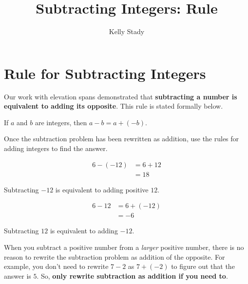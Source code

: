 \documentclass{ximera}[font=12pt]
\title{Subtracting Integers: Rule}   %
\author{Kelly Stady}
\begin{document}
\begin{abstract}

\end{abstract}

\maketitle
\label{xim:SubtractIntIntro}

\section*{Rule for Subtracting Integers}

Our work with elevation spans demonstrated that \textbf{subtracting a number is equivalent to adding its opposite}. This rule is stated formally below.

\begin{procedure}

If $a$ and $b$ are integers, then $a-b = a + (-b).$  \\

\end{procedure}

\begin{remark}
Once the subtraction problem has been rewritten as addition, use the rules for adding integers to find the answer.
\end{remark}


\begin{example}
\begin{align*}
6 - (-12) &= 6 + 12 \\
       &= 18
\end{align*}

Subtracting $-12$ is equivalent to adding positive $12.$ \\

\end{example}

\begin{example}
\begin{align*}
6 - 12 &= 6 + (-12) \\
       &= -6
\end{align*}

Subtracting $12$ is equivalent to adding $-12.$  \\


\end{example}


\begin{remark}
When you subtract a positive number from a \emph{larger} positive number, there is no reason to rewrite the subtraction problem as
addition of the opposite.  For example, you don't need to rewrite $7-2$ as $7 + (-2)$ to figure out that the answer is $5.$  
So, \textbf{only rewrite subtraction as addition if you need to}.
\end{remark}
\end{document}
